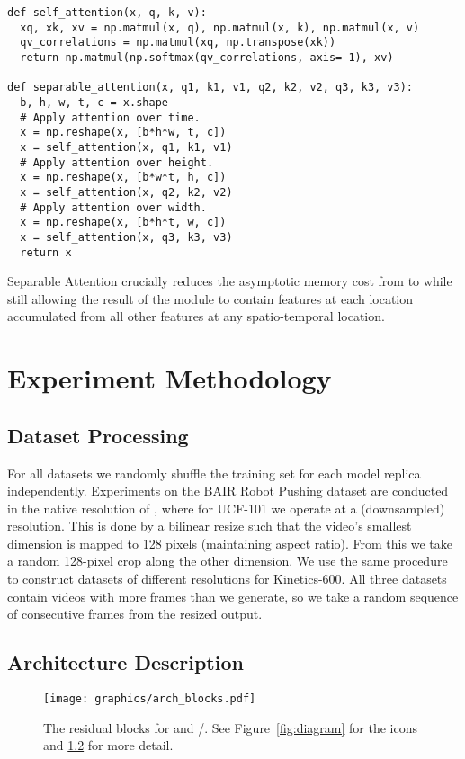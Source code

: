 \documentclass{article} \usepackage{iclr2020_conference,times}
\begin{document}
\begin{lstlisting}
def self_attention(x, q, k, v):
  xq, xk, xv = np.matmul(x, q), np.matmul(x, k), np.matmul(x, v)
  qv_correlations = np.matmul(xq, np.transpose(xk))
  return np.matmul(np.softmax(qv_correlations, axis=-1), xv)
 
def separable_attention(x, q1, k1, v1, q2, k2, v2, q3, k3, v3):
  b, h, w, t, c = x.shape
  # Apply attention over time.
  x = np.reshape(x, [b*h*w, t, c])
  x = self_attention(x, q1, k1, v1)
  # Apply attention over height.
  x = np.reshape(x, [b*w*t, h, c])
  x = self_attention(x, q2, k2, v2)
  # Apply attention over width.
  x = np.reshape(x, [b*h*t, w, c])
  x = self_attention(x, q3, k3, v3)
  return x
\end{lstlisting}

Separable Attention crucially reduces the asymptotic memory cost from  to  while still allowing the result of the module to contain features at each location accumulated from all other features at any spatio-temporal location.

\section{Experiment Methodology}

\subsection{Dataset Processing}

For all datasets we randomly shuffle the training set for each model replica independently. Experiments on the BAIR Robot Pushing dataset are conducted in the native resolution of , where for UCF-101 we operate at a (downsampled)  resolution. This is done by a bilinear resize such that the video's smallest dimension is mapped to 128 pixels (maintaining aspect ratio). From this we take a random 128-pixel crop along the other dimension. We use the same procedure to construct datasets of different resolutions for Kinetics-600.
All three datasets contain videos with more frames than we generate, so we take a random sequence of consecutive frames from the resized output. 

\subsection{Architecture Description}
\label{ap:model}

\begin{figure}[t]
\centering
\texttt{[image: graphics/arch\_blocks.pdf]}
\vspace{-1em}
\caption{The residual blocks for  and /. See Figure~\ref{fig:diagram} for the icons and \ref{ap:model} for more detail.}
\label{fig:blocks}
\end{figure}
\end{document}

